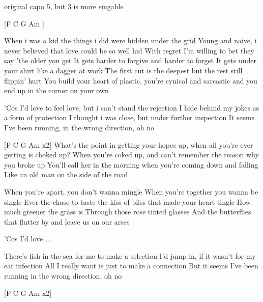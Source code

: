 
original capo 5, but 3 is more singable

[F C G Am ]
                                           
When i was a kid the things i did were hidden under the grid
Young and naive, i never believed that love could be so well hid
With regret I'm willing to bet they say 'the older you get           
It gets harder to forgive and harder to forget                         
It gets under your shirt like a dagger at work                               
The first cut is the deepest but the rest still flippin' hurt                           
You build your heart of plastic, you're cynical and sarcastic
and you end up in the corner on your own

                                     
'Cos I'd love to feel love, but i can't stand the rejection
I hide behind my jokes as a form of protection
I thought i was close, but under further inspection
It seems I've been running, in the wrong direction, oh no

[F C G Am x2]
           \slpc                                 
What's the point in getting your hopes up, when all you're ever getting is choked up?
When you're coked up, and can't remember the reason why you broke up
You'll call her in the morning when you're coming down and falling
Like an old man on the side of the road

When you're apart, you don't wanna mingle
When you're together you wanna be single                             
Ever the chase to taste the kiss of bliss that made your heart tingle
How much greener the grass is
Through those rose tinted glasses
And the butterflies that flutter by and leave us on our arses

'Cos I'd love ...
                       
There's fish in the sea for me to make a selection
I'd jump in, if it wasn't for my ear infection
All I really want is just to make a connection
But it seems I've been running in the wrong direction, oh no

[F C G Am x2]

